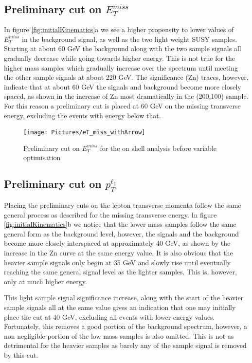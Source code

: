 \subsection{Preliminary cut on $E_{T}^{miss}$}
In figure \ref{fig:initialKinematics}a we see a higher propensity to lower values of $E_{T}^{miss}$ in the background signal, as well as the two light weight SUSY samples.
Starting at about 60 GeV the background along with the two sample signals all gradually decrease while going towards higher energy.
This is not true for the higher mass samples which gradually increase over the spectrum until meeting the other sample signals at about 220 GeV.
The significance (Zn) traces, however, indicate that at about 60 GeV the signals and background become more closely spaced, as shown in the increase of Zn most dramatically in the (200,100) sample.
For this reason a preliminary cut is placed at 60 GeV on the missing transverse energy, excluding the events with energy below that.

\begin{figure}[H] %
   \centering
   \texttt{[image: Pictures/eT\_miss\_withArrow]} 
   \caption{Preliminary cut on $E_{T}^{miss}$ for the on shell analysis before variable optimisation}
   \label{fig:example}
\end{figure}

\subsection{Preliminary cut on $p_{T}^{\ell_{1}}$}

Placing the preliminary cuts on the lepton transverse momenta follow the same general process as described for the missing transverse energy.
In figure \ref{fig:initialKinematics}b we notice that the lower mass samples follow the same general form as the background level, however, the signals and the background become more closely interspaced at approximately 40 GeV, as shown by the increase in the Zn curve at the same energy value.
It is also obvious that the heavier sample signals only begin at 35 GeV and slowly rise until eventually reaching the same general signal level as the lighter samples.
This is, however, only at much higher energy.

This light sample signal significance increase, along with the start of the heavier sample signals all at the same value gives an indication that one may initially place the cut at 40 GeV, excluding all events with lower energy values.
Fortunately, this removes a good portion of the background spectrum, however, a non negligible portion of the low mass samples is also omitted. 
This is not as detrimental for the heavier samples as barely any of the sample signal is removed by this cut. 

